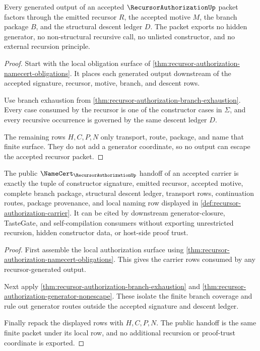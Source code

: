 \begin{theorem}
\label{thm:recursor-authorization-generator-nonescape}
Every generated output of an accepted $\RecursorAuthorizationUp$ packet factors through the emitted recursor $R$, the accepted motive $M$, the branch package $B$, and the structural descent ledger $D$. The packet exports no hidden generator, no non-structural recursive call, no unlisted constructor, and no external recursion principle.
\end{theorem}
\begin{proof}
Start with the local obligation surface of \autoref{thm:recursor-authorization-namecert-obligations}. It places each generated output downstream of the accepted signature, recursor, motive, branch, and descent rows.

Use branch exhaustion from \autoref{thm:recursor-authorization-branch-exhaustion}. Every case consumed by the recursor is one of the constructor cases in $\Sigma$, and every recursive occurrence is governed by the same descent ledger $D$.

The remaining rows $H,C,P,N$ only transport, route, package, and name that finite surface. They do not add a generator coordinate, so no output can escape the accepted recursor packet.
\end{proof}

\begin{theorem}
\label{thm:recursor-authorization-public-handoff}
The public $\NameCert_{\RecursorAuthorizationUp}$ handoff of an accepted carrier is exactly the tuple of constructor signature, emitted recursor, accepted motive, complete branch package, structural descent ledger, transport rows, continuation routes, package provenance, and local naming row displayed in \autoref{def:recursor-authorization-carrier}. It can be cited by downstream generator-closure, TasteGate, and self-compilation consumers without exporting unrestricted recursion, hidden constructor data, or host-side proof trust.
\end{theorem}
\begin{proof}
First assemble the local authorization surface using \autoref{thm:recursor-authorization-namecert-obligations}. This gives the carrier rows consumed by any recursor-generated output.

Next apply \autoref{thm:recursor-authorization-branch-exhaustion} and \autoref{thm:recursor-authorization-generator-nonescape}. These isolate the finite branch coverage and rule out generator routes outside the accepted signature and descent ledger.

Finally repack the displayed rows with $H,C,P,N$. The public handoff is the same finite packet under its local \NameCert{} row, and no additional recursion or proof-trust coordinate is exported.
\end{proof}

